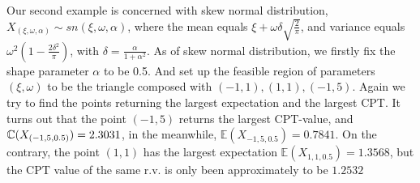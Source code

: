 Our second example is concerned with skew normal distribution, 
$X_{(\xi, \omega, \alpha)} \sim sn(\xi, \omega, \alpha)$, where the mean equals 
$\xi + \omega \delta \sqrt{\frac{2}{\pi}}$, and variance equals 
$\omega^2(1 - \frac{2\delta^2}{\pi})$, with $\delta = \frac{\alpha}{1 + \alpha^2}$.
As of skew normal distribution, we firstly fix the shape parameter $\alpha$ to be 0.5. And set up the feasible region of parameters $(\xi, \omega) $ to be the triangle composed with $(-1,1), (1,1), (-1,5)$.  Again we try to find the points returning the largest expectation and the largest CPT.
It turns out that the point $(-1,5)$ returns the largest CPT-value, and $\mathbb{C}(X_{(-1,5,0.5)}) = 2.3031$, in the meanwhile,
$\mathbb{E}(X_{-1,5,0.5}) = 0.7841$.
On the contrary, the point $(1,1)$ has the largest expectation $\mathbb{E}(X_{1,1,0.5}) = 1.3568$, but the CPT value of the same r.v. is only been approximately to be $1.2532$

